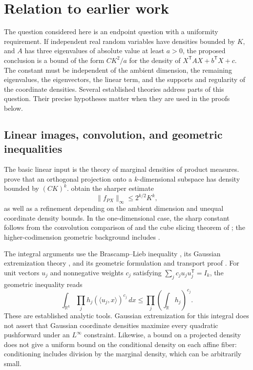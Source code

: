 \section{Relation to earlier work}\label{sec:literature}

The question considered here is an endpoint question with a uniformity requirement. If independent real random variables have densities bounded by $K$, and $A$ has three eigenvalues of absolute value at least $a>0$, the proposed conclusion is a bound of the form $C K^2/a$ for the density of $X^{\mathsf T}AX+b^{\mathsf T}X+c$. The constant must be independent of the ambient dimension, the remaining eigenvalues, the eigenvectors, the linear term, and the supports and regularity of the coordinate densities. Several established theories address parts of this question. Their precise hypotheses matter when they are used in the proofs below.

\subsection{Linear images, convolution, and geometric inequalities}

The basic linear input is the theory of marginal densities of product measures. \citet[Theorem~1.1]{RV2015} prove that an orthogonal projection onto a $k$-dimensional subspace has density bounded by $(C K)^k$. \citet[Theorem~1.1]{LPP2016} obtain the sharper estimate
\[
 \|f_{PX}\|_{\infty}\leq 2^{k/2}K^k,
\]
as well as a refinement depending on the ambient dimension and unequal coordinate density bounds. In the one-dimensional case, the sharp constant follows from the convolution comparison of \citet{Rogozin1987} and the cube slicing theorem of \citet{Ball1986}; the higher-codimension geometric background includes \citet{Ball1989}.

The integral arguments use the Brascamp--Lieb inequality \citep{BL1976}, its Gaussian extremization theory \citep{Lieb1990}, and its geometric formulation and transport proof \citep{Barthe1998}. For unit vectors $u_j$ and nonnegative weights $c_j$ satisfying $\sum_j c_j u_j u_j^{\mathsf T}=I_k$, the geometric inequality reads
\[
 \int_{\mathbb R^k}\prod_j h_j(\langle u_j,x\rangle)^{c_j}\,dx
 \leq\prod_j\left(\int_{\mathbb R}h_j\right)^{c_j}.
\]
These are established analytic tools. Gaussian extremization for this integral does not assert that Gaussian coordinate densities maximize every quadratic pushforward under an $L^\infty$ constraint. Likewise, a bound on a projected density does not give a uniform bound on the conditional density on each affine fiber: conditioning includes division by the marginal density, which can be arbitrarily small.

